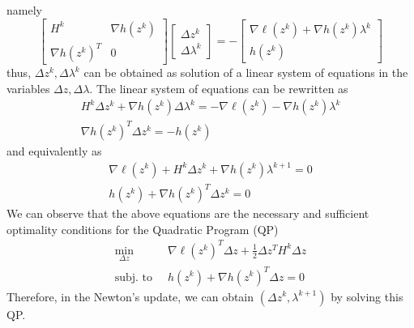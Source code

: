 \documentclass[openany]{book}
\theoremstyle{definition}
\theoremstyle{remark}
\begin{document}
namely 
\[
    \begin{bmatrix}
        H^k & \nabla h(z^k) \\
        \nabla h(z^k)^T & 0
        \end{bmatrix}  \begin{bmatrix}
        \Delta z^k \\ \Delta \lambda^k
        \end{bmatrix} = -\begin{bmatrix}
        \nabla \ell(z^k)+\nabla h(z^k)\lambda^k \\ h(z^k)
    \end{bmatrix}
\]
thus, $\Delta z^k, \Delta\lambda^k$ can be obtained as solution of a linear system of equations in the variables $\Delta z, \Delta\lambda$.
The linear system of equations can be rewritten as 
\begin{gather*}
    H^k\Delta z^k+\nabla h(z^k)\Delta \lambda^k = -\nabla\ell(z^k) - \nabla h(z^k)\lambda^k \\
    \nabla h(z^k)^T \Delta z^k = -h(z^k)
\end{gather*}
and equivalently as 
\begin{gather*}
    \nabla\ell(z^k) +H^k\Delta z^k+\nabla h(z^k)\lambda^{k+1} = 0 \\
    h(z^k)+\nabla h(z^k)^T\Delta z^k = 0
\end{gather*}
We can observe that the above equations are the necessary and sufficient optimality conditions for the Quadratic Program (QP)
\begin{align*}
    \min_{\Delta z}\  &\nabla\ell(z^k)^T\Delta z + \displaystyle\frac{1}{2}\Delta z^TH^k\Delta z \\
    \text{subj. to }\  & h(z^k) + \nabla h(z^k)^T \Delta z = 0
\end{align*}
Therefore, in the Newton's update, we can obtain $(\Delta z^k, \lambda^{k+1})$ by solving this QP.
\end{document}
